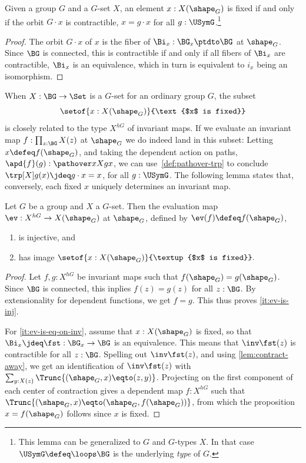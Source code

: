 \begin{lemma}\label{lem:fixed-char}
  Given a group $G$ and a $G$-set $X$, an element $x:X(\sh_G)$ is
 fixed if and only if the orbit $G\cdot x$ is contractible,
  \ie $x = g\cdot x$ for all $g:\USymG$.\footnote{%
  This lemma can be generalized to \inftygps $G$ and $G$-types $X$.
  In that case $\USymG\defeq\loops\BG$ is the underlying \emph{type} of $G$.}
\end{lemma}
\begin{proof}
  The orbit $G\cdot x$ of $x$ is the fiber of $\Bi_x : \BG_x \ptdto \BG$
  at $\sh_G$. Since $\BG$ is connected,
  this is contractible if and only if all fibers of $\Bi_x$ are contractible,
  \ie $\Bi_x$ is an equivalence, which in turn is equivalent to $i_x$
  being an isomorphism.
\end{proof}

When $X : \BG \to \Set$ is a $G$-set for an ordinary group $G$, the subset
\[
  \setof{x : X(\sh_G)}{\text{$x$ is fixed}}
\]
is closely related to the type $X^{hG}$ of invariant maps.
If we evaluate an invariant map $f : \prod_{z:\BG}X(z)$ at $\sh_G$
we do indeed land in this subset:
Letting $x\defeq f(\sh_G)$,
and taking the dependent action on paths,
$\apd{f}(g) : \pathover x X g x$,
we can use~\cref{def:pathover-trp} to conclude
$\trp[X] g(x)\jdeq g\cdot x = x$, for all $g:\USymG$.
The following lemma states that, conversely, each fixed $x$ uniquely
determines an invariant map.

\begin{lemma}\label{lem:fixpts-are-fixed}
  Let $G$ be a group and $X$ a $G$-set.%
  Then the evaluation map $\ev : X^{hG} \to X(\sh_G)$ at $\sh_G$, defined by $\ev (f) \defeq f(\sh_G)$,
  \begin{enumerate}
  \item\label{it:ev-is-inj} 
  is injective, and
\item\label{it:ev-is-eq-on-inv} has image $\setof{x :
    X(\sh_G)}{\textup{$x$ is fixed}}.$
  \end{enumerate}
\end{lemma}
\begin{proof}
  Let $f,g : X^{hG}$ be invariant maps such that $f(\sh_G) = g(\sh_G)$. Since
  $\BG$ is connected, this inplies $f(z) = g(z)$ for all $z:\BG$. By
  extensionality for dependent functions, we get $f = g$. This thus proves
  \ref{it:ev-is-inj}.
  
  For \ref{it:ev-is-eq-on-inv}, assume that
  $x : X(\sh_G)$ is fixed, so that $\Bi_x\jdeq\fst:\BG_x \to \BG$
  is an equivalence. This means that $\inv\fst(z)$ is contractible
  for all $z:\BG$. Spelling out $\inv\fst(z)$, and using \cref{lem:contract-away},
  we get an identification of $\inv\fst(z)$ with
  $\sum_{y:X(z)}\Trunc{(\sh_G,x)\eqto(z,y)}$.
  Projecting on the first component of each center of contraction
  gives a dependent map $f:X^{hG}$ such that $\Trunc{(\sh_G,x)\eqto(\sh_G,f(\sh_G))}$,
  from which the proposition $x=f(\sh_G)$ follows since $x$ is fixed.
\end{proof}

